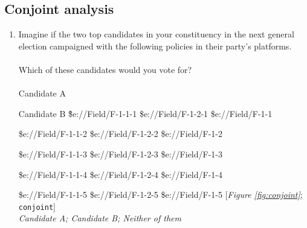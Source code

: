  \subsection*{Conjoint analysis} 
 \begin{enumerate}[resume] 
\item  \label{q:conjoint} Imagine if the two top candidates in your constituency in the next general election campaigned with the following policies in their party's platforms. \\\\Which of these candidates would you vote for?  
\\


\\




    Candidate A
    
    Candidate B
\~


\${e://Field/F-1-1-1}
\${e://Field/F-1-2-1}
\${e://Field/F-1-1}

\${e://Field/F-1-1-2}
\${e://Field/F-1-2-2}
\${e://Field/F-1-2}

\${e://Field/F-1-1-3}
\${e://Field/F-1-2-3}
\${e://Field/F-1-3}

\${e://Field/F-1-1-4}
\${e://Field/F-1-2-4}
\${e://Field/F-1-4}

\${e://Field/F-1-1-5}
\${e://Field/F-1-2-5}
\${e://Field/F-1-5} [\textit{Figure \ref{fig:conjoint}}; 
\verb|conjoint|]
  \\ \textit{Candidate A; Candidate B; Neither of them}

\end{enumerate} 

